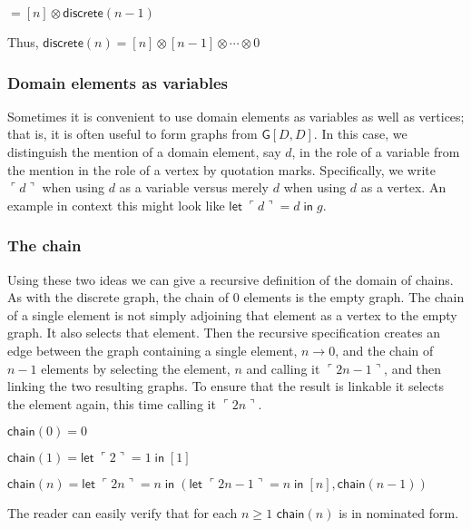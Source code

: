 \documentclass[12pt]{llncs}
\begin{document}
\(= [n]\otimes \mathsf{discrete}(n-1)\)

Thus, \(\mathsf{discrete}(n) = [n]\otimes[n-1]\otimes\cdots\otimes0\)

\hypertarget{domain-elements-as-variables}{%
\subsubsection{Domain elements as
variables}\label{domain-elements-as-variables}}

Sometimes it is convenient to use domain elements as variables as well
as vertices; that is, it is often useful to form graphs from
\(\mathsf{G}[D,D]\). In this case, we distinguish the mention of a
domain element, say \(d\), in the role of a variable from the mention in
the role of a vertex by quotation marks. Specifically, we write
\(\ulcorner d\urcorner\) when using \(d\) as a variable versus merely
\(d\) when using \(d\) as a vertex. An example in context this might
look like
\(\mathsf{let}\; \ulcorner d\urcorner = d \; \mathsf{in}\; g\).

\hypertarget{the-chain}{%
\subsubsection{The chain}\label{the-chain}}

Using these two ideas we can give a recursive definition of the domain
of chains. As with the discrete graph, the chain of \(0\) elements is
the empty graph. The chain of a single element is not simply adjoining
that element as a vertex to the empty graph. It also selects that
element. Then the recursive specification creates an edge between the
graph containing a single element, \(n \to 0\), and the chain of \(n-1\)
elements by selecting the element, \(n\) and calling it
\(\ulcorner 2n-1\urcorner\), and then linking the two resulting graphs.
To ensure that the result is linkable it selects the element again, this
time calling it \(\ulcorner 2n \urcorner\).

\(\mathsf{chain}(0) = 0\)

\(\mathsf{chain}(1) = \mathsf{let}\; \ulcorner 2\urcorner = 1 \; \mathsf{in}\; [1]\)

\(\mathsf{chain}(n) = \mathsf{let}\; \ulcorner2n\urcorner = n \; \mathsf{in}\;(\mathsf{let}\; \ulcorner 2n-1\urcorner = n \; \mathsf{in}\; [n], \mathsf{chain}(n-1))\)

The reader can easily verify that for each \(n \geq 1\)
\(\mathsf{chain}(n)\) is in nominated form.
\end{document}

